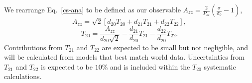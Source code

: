 
We rearrange Eq.~\ref{cs-ana} to be defined as our observable $A_{zz} = \frac{2}{P_{zz}}\left( \frac{\sigma}{\sigma_0} - 1 \right)$,
\begin{equation}A_{zz} = \sqrt{2} \left[ d_{20} T_{20} + d_{21} T_{21} + d_{22} T_{22}\right],
\end{equation}
\begin{equation}
T_{20} = \frac{A_{zz}}{d_{20}\sqrt{2}}-\frac{d_{21}}{d_{20}}T_{21}-\frac{d_{22}}{d_{20}}T_{22}.
\end{equation}
Contributions from $T_{21}$ and $T_{22}$ are expected to be small but not negligible, and will be calculated from models that best match world data. Uncertainties from $T_{21}$ and $T_{22}$ is expected to be $10\%$ and is included within the $T_{20}$ systematic calculations.


